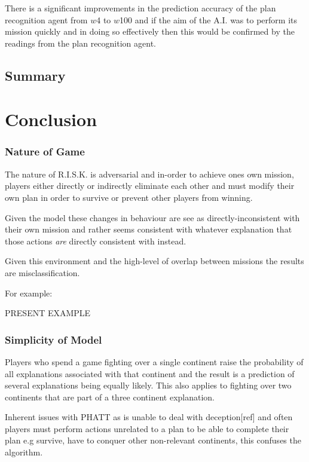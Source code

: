 \documentclass[parskip]{cs4rep}
\begin{document}
There is a significant improvements in the prediction accuracy of the plan recognition agent from $w$4 to $w$100 and if the aim of the A.I. was to perform its mission quickly and in doing so effectively then this would be confirmed by the readings from the plan recognition agent.

\section{Summary}

\chapter{Conclusion}

\subsection{Nature of Game}

The nature of R.I.S.K. is adversarial and in-order to achieve ones own mission, players either directly or indirectly eliminate each other and must modify their own plan in order to survive or prevent other players from winning. 

Given the model these changes in behaviour are see as directly-inconsistent with their own mission and rather seems consistent with whatever explanation that those actions \textit{are} directly consistent with instead.

Given this environment and the high-level of overlap between missions the results are misclassification.

For example:

PRESENT EXAMPLE

\subsection{Simplicity of Model}

Players who spend a game fighting over a single continent raise the probability of all explanations associated with that continent and the result is a prediction of several explanations being equally likely. This also applies to fighting over two continents that are part of a three continent explanation.

Inherent issues with PHATT as is unable to deal with deception[ref] and often players must perform actions unrelated to a plan to be able to complete their plan e.g survive, have to conquer other non-relevant continents, this confuses the algorithm.
\end{document}
